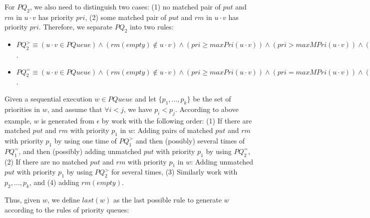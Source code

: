 For $\textit{PQ}_2$, we also need to distinguish two cases: (1) no matched pair of $\textit{put}$ and $\textit{rm}$ in $u \cdot v$ has priority $\textit{pri}$, (2) some matched pair of $\textit{put}$ and $\textit{rm}$ in $u \cdot v$ has priority $\textit{pri}$. Therefore, we separate $\textit{PQ}_2$ into two rules:

\begin{itemize}
\setlength{\itemsep}{0.5pt}
\item[-] $\textit{PQ}_2^{>} \equiv (u \cdot v \in \textit{PQueue}) \wedge (\textit{rm}(\textit{empty}) \notin u \cdot v) \wedge (\textit{pri} \geq \textit{maxPri}(u \cdot v)) \wedge (\textit{pri} > \textit{maxMPri}(u \cdot v)) \wedge (\textit{putInSeq}(u \cdot v,u,\textit{pri})) \Rightarrow (u \cdot \textit{put}(\textit{itm},\textit{pri}) \cdot v \in \textit{PQueue})$.

\item[-] $\textit{PQ}_2^{=} \equiv (u \cdot v \in \textit{PQueue}) \wedge (\textit{rm}(\textit{empty}) \notin u \cdot v) \wedge (\textit{pri} \geq \textit{maxPri}(u \cdot v)) \wedge (\textit{pri} = \textit{maxMPri}(u \cdot v)) \wedge (\textit{putInSeq}(u \cdot v,u,\textit{pri})) \wedge \Rightarrow (u \cdot \textit{put}(\textit{itm},\textit{pri}) \cdot v \in \textit{PQueue})$.
\end{itemize}


Given a sequential execution $w \in \textit{PQueue}$ and let $\{p_1,\ldots,p_k\}$ be the set of priorities in $w$, and assume that $\forall i<j$, we have $p_i < p_j$. According to above example, $w$ is generated from $\epsilon$ by work with the following order: {\color {red}(1) If there are matched $\textit{put}$ and $\textit{rm}$ with priority $p_1$ in $w$: Adding pairs of matched $\textit{put}$ and $\textit{rm}$ with priority $p_1$ by using one time of $\textit{PQ}_1^{>}$ and then (possibly) several times of $\textit{PQ}_1^{=}$, and then (possibly) adding unmatched $\textit{put}$ with priority $p_1$ by using $\textit{PQ}_2^{=}$, (2) If there are no matched $\textit{put}$ and $\textit{rm}$ with priority $p_1$ in $w$: Adding unmatched $\textit{put}$ with priority $p_1$ by using $\textit{PQ}_2^{>}$ for several times, (3) Similarly work with $p_2,\ldots,p_k$, and (4) adding $\textit{rm}(\textit{empty})$.}

Thus, given $w$, we define $\textit{last}(w)$ as the last possible rule to generate $w$ according to the rules of priority queues:

